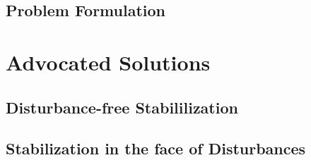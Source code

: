 \documentclass[a4paper,11pt,twoside]{book}
\begin{document}
  \chapter{Problem Formulation}
    \label{chapter:prob_formulation}

    
    
    
    
    \clearpage


\part{Advocated Solutions}
\label{part:advocated_solutions}
    \clearpage

  \chapter{Disturbance-free Stabililization}
    \label{chapter:stabilization_without_disturbance}

    
    
    
    
    \clearpage

  \chapter{Stabilization in the face of Disturbances}
    \label{chapter:stabilization_with_disturbance}

    
    
    
    
    \clearpage


\end{document}
